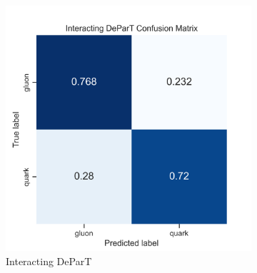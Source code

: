\begin{figure}[ht]
    \centering
    \begin{subfigure}[b]{0.49\textwidth}
        \centering
        \includegraphics[width=\textwidth]{src/plots/results/cm/interacting_depart.png}
        \caption{Interacting DeParT}
        \label{fig:confusion_depart}
    \end{subfigure}
    \begin{subfigure}[b]{0.49\textwidth}
        \centering

\end{subfigure}
\end{figure}

